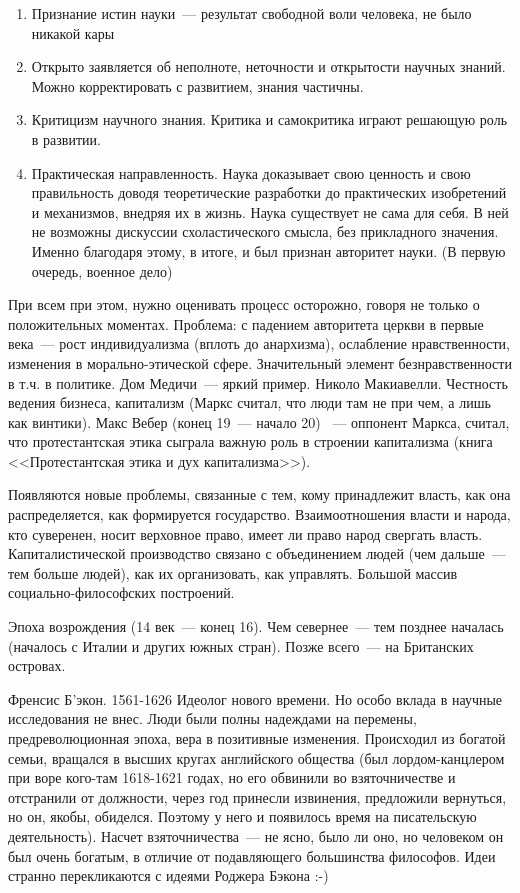 \begin{enumerate}
	\item Признание истин науки~--- результат свободной воли человека, не было никакой кары
	\item Открыто заявляется об неполноте, неточности и открытости научных знаний. Можно корректировать с развитием, знания частичны.
	\item Критицизм научного знания. Критика и самокритика играют решающую роль в развитии.
	\item Практическая направленность. Наука доказывает свою ценность и свою правильность доводя теоретические разработки до практических изобретений и механизмов, внедряя их в жизнь. Наука существует не сама для себя. В ней не возможны дискуссии схоластического смысла, без прикладного значения. Именно благодаря этому, в итоге, и был признан авторитет науки. (В первую очередь, военное дело) 
\end{enumerate}
При всем при этом, нужно оценивать процесс осторожно, говоря не только о положительных моментах. Проблема: с падением авторитета церкви в первые века~--- рост индивидуализма (вплоть до анархизма), ослабление нравственности, изменения в морально-этической сфере. Значительный элемент безнравственности в т.ч. в политике. Дом Медичи~--- яркий пример. Николо Макиавелли.
Честность ведения бизнеса, капитализм (Маркс считал, что люди там не при чем, а лишь как винтики). Макс Вебер (конец 19~--- начало 20) ~--- оппонент Маркса, считал, что протестантская этика сыграла важную роль в строении капитализма (книга <<Протестантская этика и дух капитализма>>). 

Появляются новые проблемы, связанные с тем, кому принадлежит власть, как она распределяется, как формируется государство. Взаимоотношения власти и народа, кто суверенен, носит верховное право, имеет ли право народ свергать власть. Капиталистической производство связано с объединением людей (чем дальше~--- тем больше людей), как их организовать, как управлять. Большой массив социально-философских построений.

Эпоха возрождения (14 век~--- конец 16). Чем севернее~--- тем позднее началась (началось с Италии и других южных стран). Позже всего~--- на Британских островах.

Френсис Б'экон. 1561-1626
Идеолог нового времени. Но особо вклада в научные исследования не внес. Люди были полны надеждами на перемены, предреволюционная эпоха, вера в позитивные изменения. Происходил из богатой семьи, вращался в высших кругах английского общества (был лордом-канцлером при воре кого-там 1618-1621 годах, но его обвинили во взяточничестве и отстранили от должности, через год принесли извинения, предложили вернуться, но он, якобы, обиделся. Поэтому у него и появилось время на писательскую деятельность). Насчет взяточничества~--- не ясно, было ли оно, но человеком он был очень богатым, в отличие от подавляющего большинства философов. Идеи странно перекликаются с идеями Роджера Бэкона :-) 

